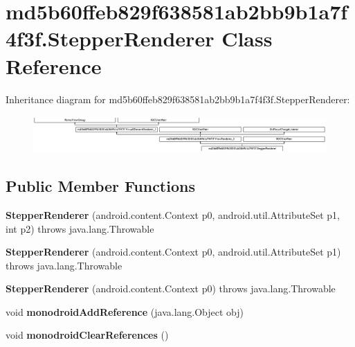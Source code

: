 \hypertarget{classmd5b60ffeb829f638581ab2bb9b1a7f4f3f_1_1StepperRenderer}{}\section{md5b60ffeb829f638581ab2bb9b1a7f4f3f.\+Stepper\+Renderer Class Reference}
\label{classmd5b60ffeb829f638581ab2bb9b1a7f4f3f_1_1StepperRenderer}
Inheritance diagram for md5b60ffeb829f638581ab2bb9b1a7f4f3f.\+Stepper\+Renderer\+:\begin{figure}[H]
\begin{center}
\leavevmode
\includegraphics[height=1.403509cm]{classmd5b60ffeb829f638581ab2bb9b1a7f4f3f_1_1StepperRenderer}
\end{center}
\end{figure}
\subsection*{Public Member Functions}
\begin{DoxyCompactItemize}
\item 
\mbox{\label{classmd5b60ffeb829f638581ab2bb9b1a7f4f3f_1_1StepperRenderer_a2ef88542d6857f04d735dda737d2dce5}} 
{\bfseries Stepper\+Renderer} (android.\+content.\+Context p0, android.\+util.\+Attribute\+Set p1, int p2)  throws java.\+lang.\+Throwable 	
\item 
\mbox{\label{classmd5b60ffeb829f638581ab2bb9b1a7f4f3f_1_1StepperRenderer_afe7aea890375adfb8ffdd5ac53251bf3}} 
{\bfseries Stepper\+Renderer} (android.\+content.\+Context p0, android.\+util.\+Attribute\+Set p1)  throws java.\+lang.\+Throwable 	
\item 
\mbox{\label{classmd5b60ffeb829f638581ab2bb9b1a7f4f3f_1_1StepperRenderer_a990efbc9f4d9a90ef0b0ffdf69560899}} 
{\bfseries Stepper\+Renderer} (android.\+content.\+Context p0)  throws java.\+lang.\+Throwable 	
\item 
\mbox{\label{classmd5b60ffeb829f638581ab2bb9b1a7f4f3f_1_1StepperRenderer_a772f7be0ba769c29dffe9b37cca95502}} 
void {\bfseries monodroid\+Add\+Reference} (java.\+lang.\+Object obj)
\item 
\mbox{\label{classmd5b60ffeb829f638581ab2bb9b1a7f4f3f_1_1StepperRenderer_a47b2498d2f24016154368d5bb6dd5843}} 
void {\bfseries monodroid\+Clear\+References} ()
\end{DoxyCompactItemize}
